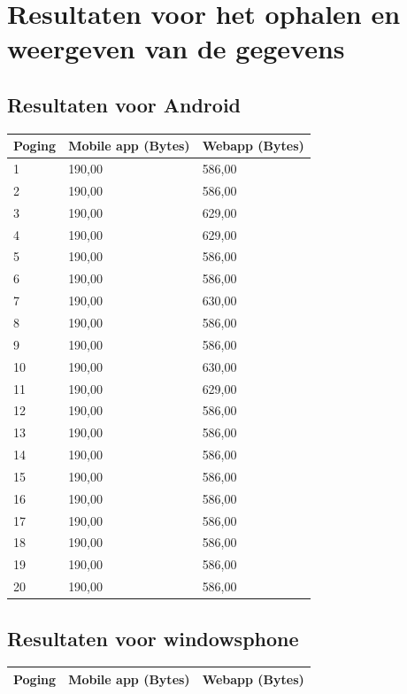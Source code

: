 \documentclass[pdftex,a4paper,12pt,twoside]{report}
\begin{document}
\section{Resultaten voor het ophalen en weergeven van de gegevens}
\subsection{Resultaten voor Android}
\begin{center}
  \begin{tabular}{ | l | l | l |}
      \\ \hline
      Poging & Mobile app (Bytes) & Webapp (Bytes)
      \\ \hline
      1 & 190,00 & 586,00
      \\ \hline
      2 & 190,00 & 586,00
      \\ \hline
      3 & 190,00 & 629,00
      \\ \hline
      4 & 190,00 & 629,00
      \\ \hline
      5 & 190,00 & 586,00
      \\ \hline
      6 & 190,00 & 586,00
      \\ \hline
      7 & 190,00 & 630,00
      \\ \hline
      8 & 190,00 & 586,00
      \\ \hline
      9 & 190,00 & 586,00
      \\ \hline
      10 & 190,00 & 630,00
      \\ \hline
      11 & 190,00 & 629,00
      \\ \hline
      12 & 190,00 & 586,00
      \\ \hline
      13 & 190,00 & 586,00
      \\ \hline
      14 & 190,00 & 586,00
      \\ \hline
      15 & 190,00 & 586,00
      \\ \hline
      16 & 190,00 & 586,00
      \\ \hline
      17 & 190,00 & 586,00
      \\ \hline
      18 & 190,00 & 586,00
      \\ \hline
      19 & 190,00 & 586,00
      \\ \hline
      20 & 190,00 & 586,00
      \\ \hline
  \end{tabular}
\end{center}
\newpage
\subsection{Resultaten voor windowsphone}
\begin{center}
  \begin{tabular}{ | l | l | l |}
      \hline
      Poging & Mobile app (Bytes) & Webapp (Bytes)
      \\ \hline
  \end{tabular}
\end{center}
\end{document}
